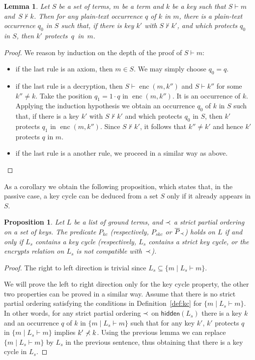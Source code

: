 \documentclass[acmtocl,acmnow]{acmtrans2m}
\newtheorem{proposition}[theorem]{Proposition}
\newtheorem{lemma}[theorem]{Lemma}
\newcommand{\penc}[2]{\operatorname{enc}(#1,#2)}
\newcommand{\lset}[1]{#1_s}
\newcommand{\hidden}[1]{\mathsf{hidden}({#1})}
\begin{document}
\begin{lemma}\label{lem:protects_deduc2}
Let $S$ be a set of terms, $m$ be a term and $k$ be 
a key such that $S\vdash m$ and~$S\not\vdash k$. Then for
any plain-text occurrence $q$ of $k$ in $m$, there is a plain-text occurrence $q_0$ in $S$ such that,
if there is key $k'$ with $S\not\vdash k'$, and
which protects $q_0$ in $S$, then $k'$ protects~$q$~in~$m$.
\end{lemma}
\begin{proof}
We reason by induction on the depth of the proof of $S\vdash m$:\begin{itemize}
 \item if the last rule is an axiom, then  $m\in S$. We may simply
choose $q_0=q$.\item if the last rule is a decryption, 
then $S\vdash \penc{m}{k''}$ and $S\vdash k''$ for some $k''\neq k$.
Take the position $q_1=1\cdot q$ in $\penc{m}{k''}$. It is an occurrence of $k$. Applying the induction
hypothesis we obtain an occurrence $q_0$ of $k$ in $S$ such that, if there is a key
$k'$ with $S\not\vdash k'$ and
which protects $q_0$ in $S$, then
$k'$ protects $q_1$ in  $\penc{m}{k''}$. Since $S\not\vdash k'$, it
follows that $k''\neq k'$ and hence $k'$ protects $q$ in $m$.
\item if the last rule is a another rule, we  proceed in a similar
way as above.
\end{itemize}
\end{proof}

As a corollary we obtain the following proposition, which
 states that, in the passive case, a key cycle can be
deduced from a set $S$ only if it already appears in $S$.
\begin{proposition}\label{prop:prop_deduc}
Let $L$ be a list of ground terms, and $\prec$ a strict partial ordering on a set of keys. The
predicate  $P_{kc}$ (respectively, $P_{skc}$ or $\overline{P}_{\prec}$) holds on
$L$ if and only if $\lset{L}$ contains a key cycle (respectively, $\lset{L}$ contains a strict key cycle, or
the encrypts relation on $\lset{L}$ is not compatible with~$\prec$). 
\end{proposition}
\begin{proof}
The right to left direction is trivial since $\lset{L}\subseteq\{m\mid\lset{L}\vdash m\}$.

We will prove the left to right direction only for the key cycle property,
 the other two properties can be proved in a similar way. Assume that there is no strict partial ordering satisfying the conditions in
Definition~\ref{def:kc} for $\{m\mid\lset{L}\vdash m\}$. In other words, for any strict partial ordering $\prec$
on $\hidden{\lset{L}}$ there is a key $k$ and an occurrence $q$ of $k$ in $\{m\mid\lset{L}\vdash m\}$ such
that for any key $k'$,  $k'$ protects $q$ in $\{m\mid\lset{L}\vdash m\}$ implies $k'\not\prec k$. Using the
previous lemma we can replace $\{m\mid\lset{L}\vdash m\}$ by $\lset{L}$ in the previous sentence, thus
obtaining that there is a key cycle in $\lset{L}$.
\end{proof}
\end{document}
